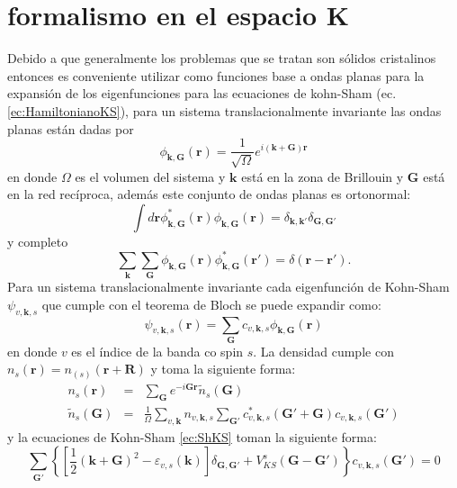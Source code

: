 \documentclass[12pt,a4paper, oneside]{book}
\begin{document}
   \section{formalismo  en el espacio K}\label{sec:solespacioK}
   Debido a que generalmente los problemas que se tratan son s\'olidos cristalinos entonces es conveniente  utilizar como funciones base a ondas planas para la expansi\'on de los eigenfunciones para las ecuaciones de kohn-Sham (ec. \ref{ec:HamiltonianoKS}), para un sistema  translacionalmente invariante las ondas planas est\'an dadas por
   \begin{equation}
   \phi_{\pmb{k},\pmb{G}} (\pmb{r})= \frac{1}{\sqrt{\Omega}} e^{i (\pmb{k}+\pmb{G})\pmb{r}} \label{ec:ondaplana}
   \end{equation}
   en donde $\Omega$ es el volumen del sistema y $\pmb{k} $ est\'a en la zona de Brillouin y $\pmb{G}$ est\'a en la red rec\'iproca, adem\'as este conjunto de ondas planas es ortonormal:
   \begin{equation}
   \int d \pmb{r} \phi_{\pmb{k},\pmb{G}}^* (\pmb{r}) \phi_{\pmb{k},\pmb{G}} (\pmb{r}) = \delta_{\pmb{k}, \pmb{k'}} \delta_{\pmb{G}, \pmb{G'}} \label{ec:PWorto}
   \end{equation} 
   y completo
   \begin{equation}
   \sum_{\pmb{k}} \sum_{\pmb{G}}  \phi_{\pmb{k},\pmb{G}} (\pmb{r}) \phi_{\pmb{k},\pmb{G}}^* (\pmb{r'}) = \delta (\pmb{r}- \pmb{r'}). \label{ec:PWComp}
   \end{equation}
   Para un sistema translacionalmente invariante cada eigenfunci\'on de Kohn-Sham $\psi_{v,\pmb{k},s }$ que cumple con el teorema de Bloch se puede expandir como:
   \begin{equation}
   \psi_{v,\pmb{k},s } (\pmb{r}) = \sum_{\pmb{G}} c_{v,\pmb{k},s } \phi_{\pmb{k},\pmb{G}} (\pmb{r}) \label{ec:basePW}
   \end{equation}
   en donde $v$ es el \'indice de la banda co  spin $s$. La densidad cumple con $n_s (\pmb{r}) = n_(s) (\pmb{r}+\pmb{R})$ y toma la siguiente forma:
   \begin{eqnarray}
   n_s(\pmb{r}) &=& \sum_{\pmb{G}} e^{-i \pmb{G} \pmb{r}} \tilde{n}_s (\pmb{G})  \label{ec:desnsiadK}\\
   \tilde{n}_s (\pmb{G}) &=& \frac{1}{\Omega} \sum_{v,\pmb{k}} n_{v,\pmb{k},s} \sum_{\pmb{G'}} c_{v,\pmb{k},s}^* (\pmb{G'}+\pmb{G}) c_{v,\pmb{k},s} (\pmb{G'}) \nonumber
   \end{eqnarray}
   y la ecuaciones de Kohn-Sham \ref{ec:ShKS} toman la siguiente forma:
   \begin{equation}
   \sum_{\pmb{G'}} \left\{ \left[\frac{1}{2} (\pmb{k}+ \pmb{G})^2 - \varepsilon_{v,s} (\pmb{k}) \right] \delta_{\pmb{G},\pmb{G'}} + V_{KS} ^ s (\pmb{G}-\pmb{G'}) \right\} c_{v,\pmb{k},s} (\pmb{G'}) =0 \label{ec:HKSRes}
   \end{equation} 
\end{document}
